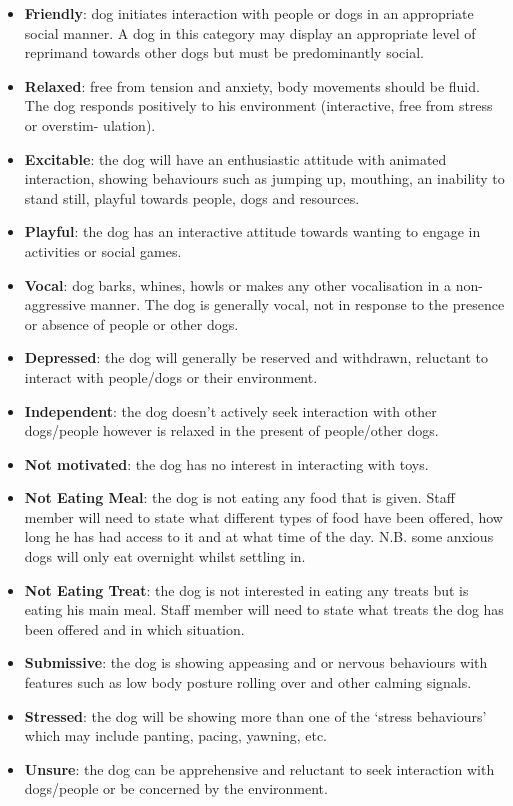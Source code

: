 \documentclass[12pt]{article}
\begin{document}
\begin{itemize}
  \item \textbf{Friendly}: dog initiates interaction with people or dogs in an appropriate social manner. A dog in this category may display an appropriate level of reprimand towards other dogs but must be predominantly social.
  \item \textbf{Relaxed}: free from tension and anxiety, body movements should be fluid. The dog responds positively to his environment (interactive, free from stress or overstim-
  ulation).
  \item \textbf{Excitable}: the dog will have an enthusiastic attitude with animated interaction, showing behaviours such as jumping up, mouthing, an inability to stand still, playful towards people, dogs and resources.
  \item \textbf{Playful}: the dog has an interactive attitude towards wanting to engage in activities or social games.
  \item \textbf{Vocal}: dog barks, whines, howls or makes any other vocalisation in a non-aggressive manner. The dog is generally vocal, not in response to the presence or absence of people or other dogs.
  \item \textbf{Depressed}: the dog will generally be reserved and withdrawn, reluctant to interact with people/dogs or their environment.
  \item \textbf{Independent}: the dog doesn’t actively seek interaction with other dogs/people however is relaxed in the present of people/other dogs.
  \item \textbf{Not motivated}: the dog has no interest in interacting with toys.
  \item \textbf{Not Eating Meal}: the dog is not eating any food that is given. Staff member will need to state what different types of food have been offered, how long he has had access to it and at what time of the day. N.B. some anxious dogs will only eat overnight whilst settling in.
  \item \textbf{Not Eating Treat}: the dog is not interested in eating any treats but is eating his main meal. Staff member will need to state what treats the dog has been offered and in which situation.
  \item \textbf{Submissive}: the dog is showing appeasing and or nervous behaviours with features such as low body posture rolling over and other calming signals.
  \item \textbf{Stressed}: the dog will be showing more than one of the ‘stress behaviours’ which may include panting, pacing, yawning, etc.
  \item \textbf{Unsure}: the dog can be apprehensive and reluctant to seek interaction with dogs/people or be concerned by the environment.
\end{itemize}
\end{document}
